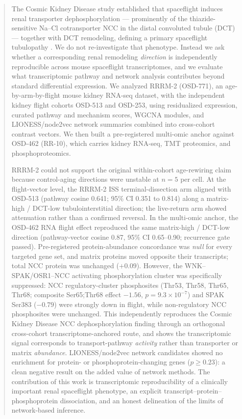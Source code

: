 \documentclass[11pt]{article}
\begin{document}
\begin{abstract}
\noindent
The Cosmic Kidney Disease study established that spaceflight induces renal transporter dephosphorylation --- prominently of the thiazide-sensitive Na--Cl cotransporter NCC in the distal convoluted tubule (DCT) --- together with DCT remodeling, defining a primary spaceflight tubulopathy \citep{siew2024cosmic}. We do not re-investigate that phenotype. Instead we ask whether a corresponding renal remodeling \emph{direction} is independently reproducible across mouse spaceflight transcriptomes, and we evaluate what transcriptomic pathway and network analysis contributes beyond standard differential expression. We analyzed RRRM-2 (OSD-771), an age-by-arm-by-flight mouse kidney RNA-seq dataset, with the independent kidney flight cohorts OSD-513 and OSD-253, using residualized expression, curated pathway and mechanism scores, WGCNA modules, and LIONESS/node2vec network summaries combined into cross-cohort contrast vectors. We then built a pre-registered multi-omic anchor against OSD-462 (RR-10), which carries kidney RNA-seq, TMT proteomics, and phosphoproteomics.

RRRM-2 could not support the original within-cohort age-rewiring claim because control-aging directions were unstable at $n=5$ per cell. At the flight-vector level, the RRRM-2 ISS terminal-dissection arm aligned with OSD-513 (pathway cosine 0.641; 95\% CI 0.351 to 0.814) along a matrix-high / DCT-low tubulointerstitial direction; the live-return arm showed attenuation rather than a confirmed reversal. In the multi-omic anchor, the OSD-462 RNA flight effect reproduced the same matrix-high / DCT-low direction (pathway-vector cosine 0.87, 95\% CI 0.65--0.90; recurrence gate passed). Pre-registered protein-abundance concordance was \emph{null} for every targeted gene set, and matrix proteins moved opposite their transcripts; total NCC protein was unchanged ($+0.09$). However, the WNK--SPAK/OSR1--NCC activating phosphorylation cluster was specifically suppressed: NCC regulatory-cluster phosphosites (Thr53, Thr58, Thr65, Thr68; composite Ser65;Thr68 effect $-1.56$, $p=9.3\times10^{-7}$) and SPAK Ser383 ($-0.79$) were strongly down in flight, while non-regulatory NCC phosphosites were unchanged. This independently reproduces the Cosmic Kidney Disease NCC dephosphorylation finding through an orthogonal cross-cohort transcriptome-anchored route, and shows the transcriptomic signal corresponds to transport-pathway \emph{activity} rather than transporter or matrix \emph{abundance}. LIONESS/node2vec network candidates showed no enrichment for protein- or phosphoprotein-changing genes ($p\geq0.23$): a clean negative result on the added value of network methods. The contribution of this work is transcriptomic reproducibility of a clinically important renal spaceflight phenotype, an explicit transcript--protein--phosphoprotein dissociation, and an honest delineation of the limits of network-based inference.
\end{abstract}
\end{document}
